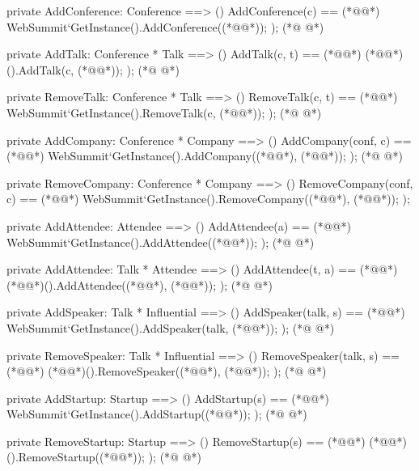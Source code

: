 \begin{vdmpp}[breaklines=true]
 private AddConference: Conference ==> ()
 AddConference(c) == (*@\vdmnotcovered{(}@*)
  WebSummit`GetInstance().AddConference((*@@*));
 );
(*@
\label{RemoveTalk:458}
@*)
 
 private AddTalk: Conference * Talk ==> ()
 AddTalk(c, t) == (*@\vdmnotcovered{(}@*)
  (*@@*)().AddTalk(c, (*@@*));
  );
(*@
\label{AddCompany:463}
@*)
 
 private RemoveTalk: Conference * Talk ==> ()
 RemoveTalk(c, t) == (*@\vdmnotcovered{(}@*)
  WebSummit`GetInstance().RemoveTalk(c, (*@@*));
 );
(*@
\label{RemoveCompany:468}
@*)
 
 private AddCompany: Conference * Company ==> ()
 AddCompany(conf, c) == (*@\vdmnotcovered{(}@*)
  WebSummit`GetInstance().AddCompany((*@@*), (*@@*));
 );
(*@
\label{AddAttendee:473}
@*)
 
 private RemoveCompany: Conference * Company ==> ()
 RemoveCompany(conf, c) == (*@\vdmnotcovered{(}@*)
  WebSummit`GetInstance().RemoveCompany((*@@*), (*@@*));
 );
 
 private AddAttendee: Attendee ==> ()
 AddAttendee(a) == (*@\vdmnotcovered{(}@*)
  WebSummit`GetInstance().AddAttendee((*@@*));
 );
(*@
\label{AddSpeaker:483}
@*)
 
 private AddAttendee: Talk * Attendee ==> ()
 AddAttendee(t, a) == (*@\vdmnotcovered{(}@*)
  (*@@*)().AddAttendee((*@@*), (*@@*));
 );
(*@
\label{RemoveSpeaker:488}
@*)

 private AddSpeaker: Talk * Influential ==> ()
 AddSpeaker(talk, s) == (*@\vdmnotcovered{(}@*)
  WebSummit`GetInstance().AddSpeaker(talk, (*@@*));
 );
(*@
\label{AddStartup:493}
@*)
 
 private RemoveSpeaker: Talk * Influential ==> ()
 RemoveSpeaker(talk, s) == (*@\vdmnotcovered{(}@*)
  (*@@*)().RemoveSpeaker((*@@*), (*@@*));
 ); 
(*@
\label{RemoveStartup:498}
@*)
  
 private AddStartup: Startup ==> ()
 AddStartup(s) == (*@\vdmnotcovered{(}@*)
  WebSummit`GetInstance().AddStartup((*@@*));
 );
(*@
\label{GetStartups:503}
@*)
 
 private RemoveStartup: Startup ==> ()
 RemoveStartup(s) == (*@\vdmnotcovered{(}@*)
  (*@@*)().RemoveStartup((*@@*));
 ); 
(*@
\label{AddInvestor:508}
@*)
 

\end{vdmpp}
